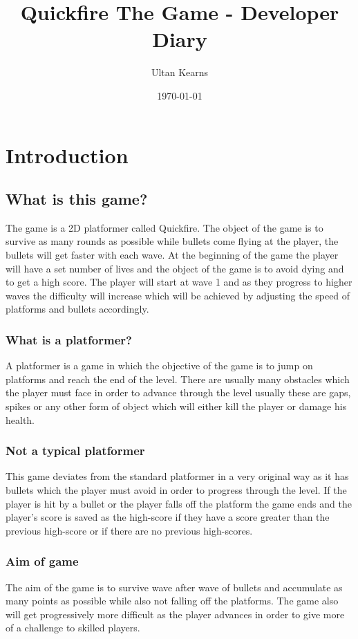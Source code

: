 \documentclass{report}
\title{Quickfire The Game - Developer Diary}
\author{Ultan Kearns}
\date{\today}
\begin{document}
\maketitle
\tableofcontents
\chapter{Introduction}
\section{What is this game?}
The game is a 2D platformer called Quickfire.  
The object of the game is 
to survive as many rounds as possible while bullets come flying at the player, the bullets will get faster with each wave. At the beginning of the game the player will have a set number of lives and the object of the game is to avoid dying and to get a high score. The player will start at wave 1 and as they progress to higher waves the difficulty will increase which will be achieved by adjusting the speed of platforms and bullets accordingly.
\subsection{What is a platformer?}
A platformer is a game in which the objective of the game is to jump on platforms and reach the end of the level\cite{Platformer}.  There are usually many obstacles which the player must face in order to advance through the level usually these are gaps, spikes or any other form of object which will either kill the player or damage his health.
\subsection{Not a typical platformer}
This game deviates from the standard platformer\cite{Platformer} in a very original way as it has bullets which the player must avoid in order to progress through the level.  If the player is hit by a bullet or the player falls off the platform the game ends and the player's score is saved as the high-score if they have a score greater than the previous high-score or if there are no previous high-scores.
\subsection{Aim of game}
The aim of the game is to survive wave after wave of bullets and accumulate as many points as possible while also not falling off the platforms.  The game also will get progressively more difficult as the player advances in order to give more of a challenge to skilled players.
\end{document}
